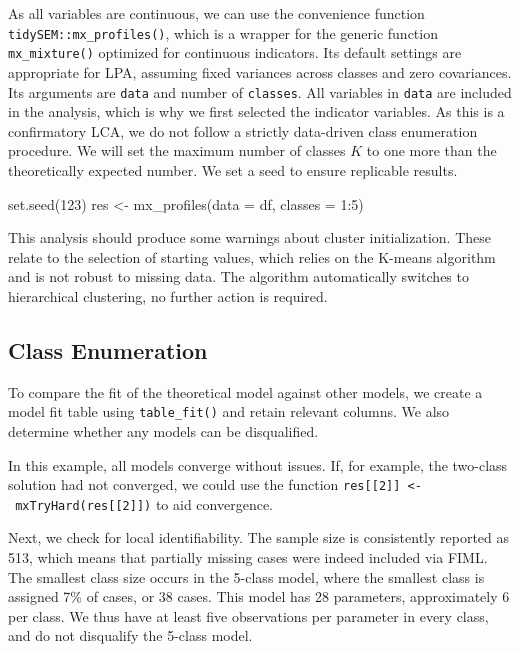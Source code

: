 \documentclass[
  man,floatsintext]{apa6}
\newenvironment{Shaded}{\begin{snugshade}}{\end{snugshade}}
\newcommand{\AttributeTok}[1]{\textcolor[rgb]{0.77,0.63,0.00}{#1}}
\newcommand{\DecValTok}[1]{\textcolor[rgb]{0.00,0.00,0.81}{#1}}
\newcommand{\FunctionTok}[1]{\textcolor[rgb]{0.00,0.00,0.00}{#1}}
\newcommand{\NormalTok}[1]{#1}
\newcommand{\OtherTok}[1]{\textcolor[rgb]{0.56,0.35,0.01}{#1}}
\newcommand{\SpecialCharTok}[1]{\textcolor[rgb]{0.00,0.00,0.00}{#1}}
\begin{document}
As all variables are continuous, we can use the convenience function \texttt{tidySEM::mx\_profiles()}, which is a wrapper for the generic function \texttt{mx\_mixture()} optimized for continuous indicators.
Its default settings are appropriate for LPA, assuming fixed variances across classes and zero covariances.
Its arguments are \texttt{data} and number of \texttt{classes}.
All variables in \texttt{data} are included in the analysis, which is why we first selected the indicator variables.
As this is a confirmatory LCA, we do not follow a strictly data-driven class enumeration procedure.
We will set the maximum number of classes \(K\) to one more than the theoretically expected number.
We set a seed to ensure replicable results.

\begin{Shaded}
\begin{Highlighting}[]
\FunctionTok{set.seed}\NormalTok{(}\DecValTok{123}\NormalTok{)}
\NormalTok{res }\OtherTok{\textless{}{-}} \FunctionTok{mx\_profiles}\NormalTok{(}\AttributeTok{data =}\NormalTok{ df,}
                   \AttributeTok{classes =} \DecValTok{1}\SpecialCharTok{:}\DecValTok{5}\NormalTok{)}
\end{Highlighting}
\end{Shaded}

This analysis should produce some warnings about cluster initialization.
These relate to the selection of starting values, which relies on the K-means algorithm and is not robust to missing data.
The algorithm automatically switches to hierarchical clustering, no further action is required.

\hypertarget{class-enumeration}{%
\subsection{Class Enumeration}\label{class-enumeration}}

To compare the fit of the theoretical model against other models, we create a model fit table using \texttt{table\_fit()} and retain relevant columns.
We also determine whether any models can be disqualified.

In this example, all models converge without issues.
If, for example, the two-class solution had not converged, we could use the function \texttt{res{[}{[}2{]}{]}\ \textless{}-\ mxTryHard(res{[}{[}2{]}{]})} to aid convergence.

Next, we check for local identifiability.
The sample size is consistently reported as 513, which means that partially missing cases were indeed included via FIML.
The smallest class size occurs in the 5-class model, where the smallest class is assigned 7\% of cases, or 38 cases.
This model has 28 parameters, approximately 6 per class.
We thus have at least five observations per parameter in every class, and do not disqualify the 5-class model.
\end{document}
